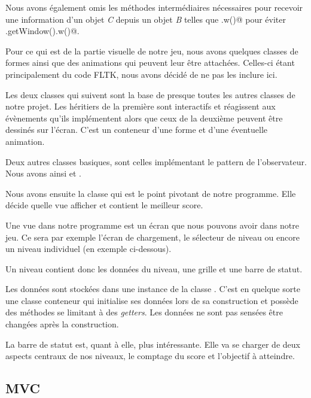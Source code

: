 \documentclass[11pt,a4paper]{article}
\newcommand{\addcode}[3]{
	\begin{figure}[H]
		\centering
		
	\end{figure}
}
\begin{document}
Nous avons également omis les méthodes intermédiaires
nécessaires pour recevoir une information d'un objet
\emph{C} depuis un objet \emph{B} telles que \verb@b.w()@ pour
éviter \verb@b.getWindow().w()@.

Pour ce qui est de la partie visuelle de notre jeu, nous
avons quelques classes de formes ainsi que des animations
qui peuvent leur être attachées. Celles-ci étant
principalement du code FLTK, nous avons décidé de ne pas les
inclure ici.

Les deux classes qui suivent sont la base de presque toutes
les autres classes de notre projet. Les héritiers de la
première sont interactifs et réagissent aux évènements
qu'ils implémentent alors que ceux de la deuxième peuvent
être dessinés sur l'écran. C'est un conteneur d'une forme et
d'une éventuelle animation.

\addcode{code/interactive.hpp}{C++}{}{}
\addcode{code/drawableContainer.hpp}{C++}{}{}

Deux autres classes basiques, sont celles implémentant le
pattern de l'observateur. Nous avons ainsi \verb@Observer@
et \verb@Subject@.

Nous avons ensuite la classe \verb@Game@ qui est le point
pivotant de notre programme. Elle décide quelle vue
afficher et contient le meilleur score.

Une vue dans notre programme est un écran que nous pouvons
avoir dans notre jeu. Ce sera par exemple l'écran de
chargement, le sélecteur de niveau ou encore un niveau
individuel (en exemple ci-dessous).

\addcode{code/game.hpp}{C++}{}{}

\addcode{code/view.hpp}{C++}{}{}
\addcode{code/level.hpp}{C++}{}{}

Un niveau contient donc les données du niveau, une grille
et une barre de statut.

Les données sont stockées dans une instance de la classe
\verb@LevelData@. C'est en quelque sorte une classe
conteneur qui initialise ses données lors de sa construction
et possède des méthodes se limitant à des \emph{getters}.
Les données ne sont pas sensées être changées après la
construction.

La barre de statut est, quant à elle, plus intéressante.
Elle va se charger de deux aspects centraux de nos niveaux, le
comptage du score et l'objectif à atteindre.


\subsection{MVC}
\end{document}
